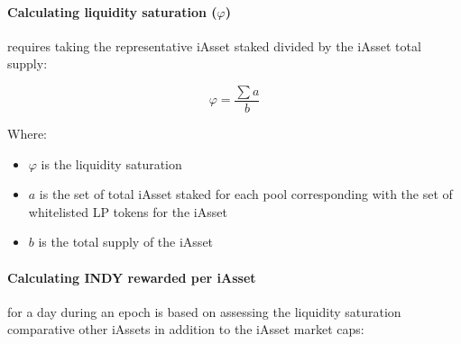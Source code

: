 \documentclass{article}
\begin{document}
\begin{sloppypar}
\hypertarget{calculating-liquidity-saturation-varphi}{%
\paragraph{\texorpdfstring{Calculating liquidity saturation
(\(\varphi\))}{Calculating liquidity saturation (\textbackslash varphi)}}\label{calculating-liquidity-saturation-varphi}}

requires taking the representative iAsset staked divided by the iAsset
total supply:

\[\varphi = \frac{\sum a}{b}\]

Where:

\begin{itemize}
\item
  \(\varphi\) is the liquidity saturation
\item
  \(a\) is the set of total iAsset staked for each pool corresponding
  with the set of whitelisted LP tokens for the iAsset
\item
  \(b\) is the total supply of the iAsset
\end{itemize}

\hypertarget{calculating-indy-rewarded-per-iasset}{%
\paragraph{Calculating INDY rewarded per
iAsset}\label{calculating-indy-rewarded-per-iasset}}

for a day during an epoch is based on assessing the liquidity saturation
comparative other iAssets in addition to the iAsset market caps:


\end{sloppypar}
\end{document}
